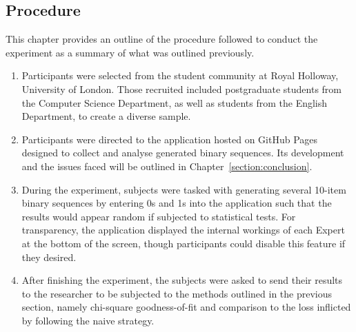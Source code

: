 \subsection{Procedure}\label{subsection:procedure}
This chapter provides an outline of the procedure followed to conduct the experiment as a summary of what was outlined previously.
\begin{enumerate}
    \item Participants were selected from the student community at Royal Holloway, University of London. Those recruited included postgraduate students from the Computer Science Department, as well as students from the English Department, to create a diverse sample.
    \item Participants were directed to the application hosted on GitHub Pages designed to collect and analyse generated binary sequences. Its development and the issues faced will be outlined in Chapter~\ref{section:conclusion}.
    \item During the experiment, subjects were tasked with generating several 10-item binary sequences by entering 0s and 1s into the application such that the results would appear random if subjected to statistical tests. For transparency, the application displayed the internal workings of each Expert at the bottom of the screen, though participants could disable this feature if they desired.
    \item After finishing the experiment, the subjects were asked to send their results to the researcher to be subjected to the methods outlined in the previous section, namely chi-square goodness-of-fit and comparison to the loss inflicted by following the naive strategy.
\end{enumerate}